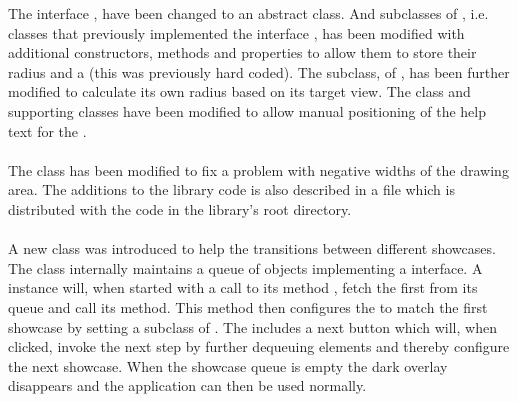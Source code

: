 The interface , have been changed to an abstract class. And subclasses of , i.e. classes that previously implemented the interface , has been modified with additional constructors, methods and properties to allow them to store their radius and a  (this was previously hard coded). The  subclass, of , has been further modified to calculate its own radius based on its target view. The  class and supporting classes have been modified to allow manual positioning of the help text for the .
\\\\
The  class has been modified to fix a problem with negative widths of the drawing area.
The additions to the library code is also described in a  file which is distributed with the code in the library's root directory.
\\\\
A new class  was introduced to help the transitions between different showcases. The class internally maintains a queue of objects implementing a  interface. A  instance will, when started with a call to its method , fetch the first  from its queue and call its  method. This  method then configures the  to match the first showcase by setting a subclass of . The  includes a next button which will, when clicked, invoke the next step by further dequeuing elements and thereby configure the next showcase. When the showcase queue is empty the dark overlay disappears and the application can then be used normally.